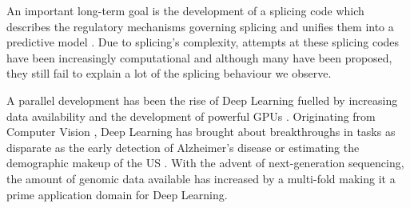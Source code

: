 An important long-term goal is the development of a splicing code which describes the regulatory mechanisms governing splicing and unifies them into a predictive model \cite{longtermcall}. Due to splicing's complexity, attempts at these splicing codes have been increasingly computational \cite{barash2010a} and although many have been proposed, they still fail to explain a lot of the splicing behaviour we observe. %



%
%












A parallel development has been the rise of Deep Learning fuelled by increasing data availability and the development of powerful GPUs \cite{deeplearning}. 
Originating from Computer Vision \cite{alexnet}, Deep Learning has brought about breakthroughs in tasks as disparate as the early detection of Alzheimer's disease \cite{alzheimerdeeplearning} or estimating the demographic makeup of the US \cite{demographic}. 
With the advent of next-generation sequencing, the amount of genomic data available has increased by a multi-fold making it a prime application domain for Deep Learning. 

